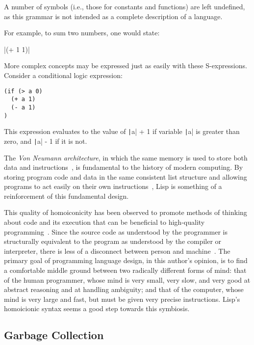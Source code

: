\documentclass[11pt,a4paper]{article}
\theoremstyle{break}
\begin{document}
A number of symbols (i.e., those for constants and functions) are left undefined, as this grammar is not intended as a complete description of a language.

For example, to sum two numbers, one would state:
\begin{listing*}
    \centering
    |(+ 1 1)|
\end{listing*}
More complex concepts may be expressed just as easily with these S-expressions. Consider a conditional logic expression:
\begin{listing*}
    \centering
\begin{verbatim}
(if (> a 0)
  (+ a 1)
  (- a 1)
)
\end{verbatim}
\end{listing*}
This expression evaluates to the value of \texttt|a| + 1 if variable \texttt|a| is greater than zero, and \texttt|a| - 1 if it is not.

The \textit{Von Neumann architecture}, in which the same memory is used to store both data and instructions~\cite{von1993first}, is fundamental to the history of modern computing. By storing program code and data in the same consistent list structure and allowing programs to act easily on their own instructions~\cite{Smith:1984:RSL:800017.800513}, Lisp is something of a reinforcement of this fundamental design.

This quality of homoiconicity has been observed to promote methods of thinking about code and its execution that can be beneficial to high-quality programming~\cite{sicp,raymond2003become}. Since the source code as understood by the programmer is structurally equivalent to the program as understood by the compiler or interpreter, there is less of a disconnect between person and machine~\cite{sicp}. The primary goal of programming language design, in this author's opinion, is to find a comfortable middle ground between two radically different forms of mind: that of the human programmer, whose mind is very small, very slow, and very good at abstract reasoning and at handling ambiguity; and that of the computer, whose mind is very large and fast, but must be given very precise instructions. Lisp's homoicionic syntax seems a good step towards this symbiosis.

\subsection{Garbage Collection}\label{subsec:gc}
\end{document}
